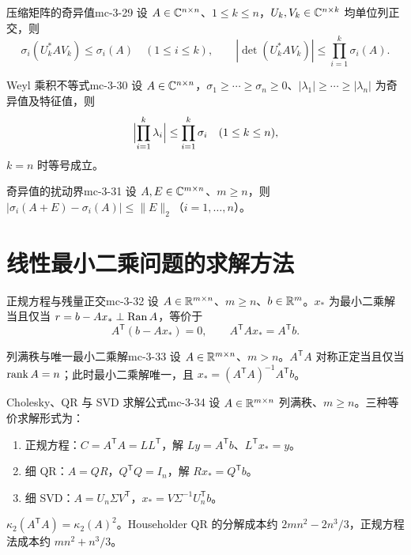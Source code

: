 \begin{lemma}{压缩矩阵的奇异值}{mc-3-29}
设 $A\in\mathbb{C}^{n\times n}$、$1\leq k\leq n$，$U_k,V_k\in\mathbb{C}^{n\times k}$ 均单位列正交，则
\[\sigma_i(U_k^*AV_k)\leq\sigma_i(A)\quad(1\leq i\leq k),\qquad
|\det(U_k^*AV_k)|\leq\prod_{i=1}^k\sigma_i(A).\]
\end{lemma}

\begin{theorem}{Weyl 乘积不等式}{mc-3-30}
设 $A\in\mathbb{C}^{n\times n}$，$\sigma_1\geq\cdots\geq\sigma_n\geq0$、$|\lambda_1|\geq\cdots\geq|\lambda_n|$ 为奇异值及特征值，则
\[\Bigl|\prod_{i=1}^k\lambda_i\Bigr|\leq\prod_{i=1}^k\sigma_i\quad(1\leq k\leq n),\]
$k=n$ 时等号成立。
\end{theorem}

\begin{theorem}{奇异值的扰动界}{mc-3-31}
设 $A,E\in\mathbb{C}^{m\times n}$、$m\geq n$，则 $|\sigma_i(A+E)-\sigma_i(A)|\leq\|E\|_2$（$i=1,\ldots,n$）。
\end{theorem}

\section{线性最小二乘问题的求解方法}

\begin{theorem}{正规方程与残量正交}{mc-3-32}
设 $A\in\mathbb{R}^{m\times n}$、$m\geq n$、$b\in\mathbb{R}^m$。$x_*$ 为最小二乘解当且仅当 $r=b-Ax_*\perp\operatorname{Ran} A$，等价于
\[A^{\mathsf T}(b-Ax_*)=0,\qquad A^{\mathsf T}Ax_*=A^{\mathsf T}b.\]
\end{theorem}

\begin{theorem}{列满秩与唯一最小二乘解}{mc-3-33}
设 $A\in\mathbb{R}^{m\times n}$、$m>n$。$A^{\mathsf T}A$ 对称正定当且仅当 $\operatorname{rank} A=n$；此时最小二乘解唯一，且 $x_*=(A^{\mathsf T}A)^{-1}A^{\mathsf T}b$。
\end{theorem}

\begin{proposition}{Cholesky、QR 与 SVD 求解公式}{mc-3-34}
设 $A\in\mathbb{R}^{m\times n}$ 列满秩、$m\geq n$。三种等价求解形式为：
\begin{enumerate}
\item 正规方程：$C=A^{\mathsf T}A=LL^{\mathsf T}$，解 $Ly=A^{\mathsf T}b$、$L^{\mathsf T}x_*=y$。
\item 细 QR：$A=QR$，$Q^{\mathsf T}Q=I_n$，解 $Rx_*=Q^{\mathsf T}b$。
\item 细 SVD：$A=U_n\Sigma V^{\mathsf T}$，$x_*=V\Sigma^{-1}U_n^{\mathsf T}b$。
\end{enumerate}
$\kappa_2(A^{\mathsf T}A)=\kappa_2(A)^2$。Householder QR 的分解成本约 $2mn^2-2n^3/3$，正规方程法成本约 $mn^2+n^3/3$。
\end{proposition}

